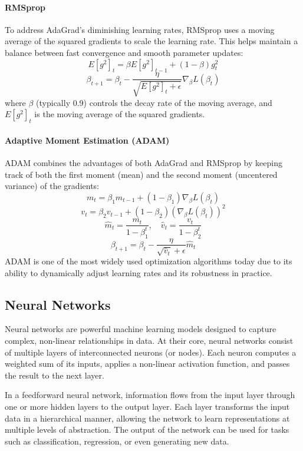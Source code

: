 \documentclass[aps,pra,english,notitlepage,reprint,nofootinbib]{revtex4-1}  %
\begin{document}
\paragraph{RMSprop}
 To address AdaGrad's diminishing learning rates, RMSprop uses a moving average of the squared gradients to scale the learning rate. This helps maintain a balance between fast convergence and smooth parameter updates:
  \[
  E[g^2]_t = \beta E[g^2]_{t-1} + (1 - \beta) g_t^2
  \]
  \[
  \beta_{t+1} = \beta_t - \frac{\eta}{\sqrt{E[g^2]_t + \epsilon}} \nabla_\beta L(\beta_t)
  \]
  where \( \beta \) (typically 0.9) controls the decay rate of the moving average, and \( E[g^2]_t \) is the moving average of the squared gradients. \\

\paragraph{Adaptive Moment Estimation (ADAM)}
 ADAM combines the advantages of both AdaGrad and RMSprop by keeping track of both the first moment (mean) and the second moment (uncentered variance) of the gradients:
  \[
  m_t = \beta_1 m_{t-1} + (1 - \beta_1) \nabla_\beta L(\beta_t)
  \]
  \[
  v_t = \beta_2 v_{t-1} + (1 - \beta_2) (\nabla_\beta L(\beta_t))^2
  \]
  \[
  \hat{m}_t = \frac{m_t}{1 - \beta_1^t}, \quad \hat{v}_t = \frac{v_t}{1 - \beta_2^t}
  \]
  \[
  \beta_{t+1} = \beta_t - \frac{\eta}{\sqrt{\hat{v}_t} + \epsilon} \hat{m}_t
  \]
  ADAM is one of the most widely used optimization algorithms today due to its ability to dynamically adjust learning rates and its robustness in practice.

\subsection{Neural Networks}

Neural networks are powerful machine learning models designed to capture complex, non-linear relationships in data. At their core, neural networks consist of multiple layers of interconnected neurons (or nodes). Each neuron computes a weighted sum of its inputs, applies a non-linear activation function, and passes the result to the next layer.

In a feedforward neural network, information flows from the input layer through one or more hidden layers to the output layer. Each layer transforms the input data in a hierarchical manner, allowing the network to learn representations at multiple levels of abstraction. The output of the network can be used for tasks such as classification, regression, or even generating new data.
\end{document}
